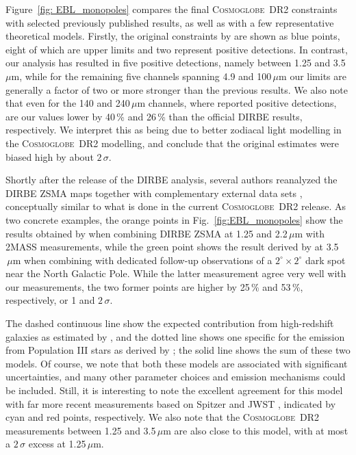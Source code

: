 \documentclass{aa}
\newcommand{\cosmoglobe}{\textsc{Cosmoglobe}}
\begin{document}
Figure~\ref{fig: EBL_monopoles} compares the final \cosmoglobe\ DR2
constraints with selected previously published results, as well as
with a few representative theoretical models. Firstly, the original
constraints by \citet{hauser1998} are shown as blue points, eight of
which are upper limits and two represent positive detections. In
contrast, our analysis has resulted in five positive detections,
namely between 1.25 and 3.5\,$\mu\mathrm{m}$, while for the remaining
five channels spanning 4.9 and 100$\,\mu\mathrm{m}$ our limits are
generally a factor of two or more stronger than the previous
results. We also note that even for the 140 and 240$\,\mu\mathrm{m}$
channels, where \citet{hauser1998} reported positive detections, are
our values lower by 40\,\% and 26\,\% than the official DIRBE results,
respectively. We interpret this as being due to better zodiacal light
modelling in the \cosmoglobe\ DR2 modelling, and conclude that the
original estimates were biased high by about $2\,\sigma$.

Shortly after the release of the DIRBE analysis, several authors
reanalyzed the DIRBE ZSMA maps together with complementary external
data sets \citep[e.g.,][]{wright:2000,wright:2001}, conceptually
similar to what is done in the current \cosmoglobe\ DR2 release. As
two concrete examples, the orange points in
Fig.~\ref{fig:EBL_monopoles} show the results obtained by
\citet{cambresy:2001} when combining DIRBE ZSMA at 1.25 and
2.2$\,\mu\mathrm{m}$ with 2MASS measurements, while the green point
shows the result derived by \citet{gorjian:2000} at
3.5$\,\mu\mathrm{m}$ when combining with dedicated follow-up
observations of a $2^{\circ}\times2^{\circ}$ dark spot near the North
Galactic Pole. While the latter measurement agree very well with our
measurements, the two former points are higher by 25\,\% and 53\,\%,
respectively, or 1 and $2\,\sigma$.

The dashed continuous line show the expected contribution from
high-redshift galaxies as estimated by \citet{finke2022}, and the
dotted line shows one specific for the emission from Population III
stars as derived by \citet{santos:2002}; the solid line shows the sum
of these two models. Of course, we note that both these models are
associated with significant uncertainties, and many other parameter
choices and emission mechanisms could be included. Still, it is
interesting to note the excellent agreement for this model with far
more recent measurements based on Spitzer \citep{bethermin:2010} and
JWST \citep{stone:2024}, indicated by cyan and red points,
respectively. We also note that the \cosmoglobe\ DR2 measurements
between 1.25 and 3.5$\,\mu\mathrm{m}$ are also close to this model,
with at most a $2\,\sigma$ excess at 1.25$\,\mu\mathrm{m}$.
\end{document}
